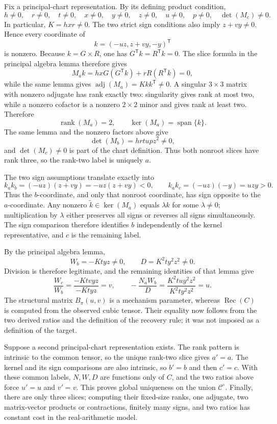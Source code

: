 Fix a principal-chart representation.  By its defining product condition,
\[
h\ne0,\quad r\ne0,\quad t\ne0,\quad x\ne0,\quad y\ne0,\quad z\ne0,\quad u\ne0,\quad p\ne0,
\quad \det(M_c)\ne0.
\]
In particular, \(K=hxr\ne0\).  The two strict sign conditions also imply \(z+vy\ne0\).  Hence every coordinate of
\[
k=(-uz,z+vy,-y)^{\mathsf T}
\]
is nonzero.  Because \(k=G\times R\), one has \(G^{\mathsf T}k=R^{\mathsf T}k=0\).  The slice formula in the principal algebra lemma therefore gives
\[
M_ak=hxG(G^{\mathsf T}k)+rR(R^{\mathsf T}k)=0,
\]
while the same lemma gives \(\operatorname{adj}(M_a)=Kkk^{\mathsf T}\ne0\).  A singular \(3\times3\) matrix with nonzero adjugate has rank exactly two: singularity gives rank at most two, while a nonzero cofactor is a nonzero \(2\times2\) minor and gives rank at least two.  Therefore
\[
\operatorname{rank}(M_a)=2,
\qquad
\ker(M_a)=\operatorname{span}\{k\}.
\]
The same lemma and the nonzero factors above give
\[
\det(M_b)=hrtupz^2\ne0,
\]
and \(\det(M_c)\ne0\) is part of the chart definition.  Thus both nonroot slices have rank three, so the rank-two label is uniquely \(a\).

The two sign assumptions translate exactly into
\[
k_ak_b=(-uz)(z+vy)=-uz(z+vy)<0,
\qquad
k_ak_c=(-uz)(-y)=uzy>0.
\]
Thus the \(b\)-coordinate, and only that nonroot coordinate, has sign opposite to the \(a\)-coordinate.  Any nonzero \(\widetilde k\in\ker(M_a)\) equals \(\lambda k\) for some \(\lambda\ne0\); multiplication by \(\lambda\) either preserves all signs or reverses all signs simultaneously.  The sign comparison therefore identifies \(b\) independently of the kernel representative, and \(c\) is the remaining label.

By the principal algebra lemma,
\[
W_b=-Ktyz\ne0,
\qquad
D=K^2ty^2z^2\ne0.
\]
Division is therefore legitimate, and the remaining identities of that lemma give
\[
\frac{W_c}{W_b}
=\frac{-Ktvyz}{-Ktyz}=v,
\qquad
-\frac{N_aW_b}{D}
=\frac{K^2tuy^2z^2}{K^2ty^2z^2}=u.
\]
The structural matrix \(B_{\pi}(u,v)\) is a mechanism parameter, whereas \(\operatorname{Rec}(C)\) is computed from the observed cubic tensor.  Their equality now follows from the two derived ratios and the definition of the recovery rule; it was not imposed as a definition of the target.

Suppose a second principal-chart representation exists.  The rank pattern is intrinsic to the common tensor, so the unique rank-two slice gives \(a'=a\).  The kernel and its sign comparisons are also intrinsic, so \(b'=b\) and then \(c'=c\).  With these common labels, \(N,W,D\) are functions only of \(C\), and the two ratios above force \(u'=u\) and \(v'=v\).  This proves global uniqueness on the union \(\mathcal C^{\circ}\).  Finally, there are only three slices; computing their fixed-size ranks, one adjugate, two matrix-vector products or contractions, finitely many signs, and two ratios has constant cost in the real-arithmetic model.

